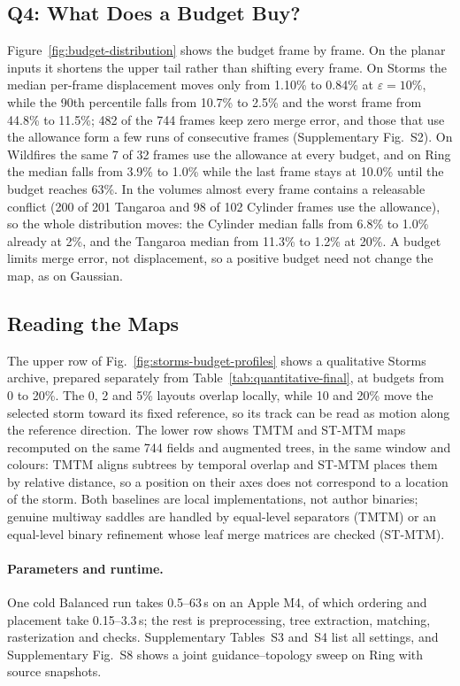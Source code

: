 \subsection{Q4: What Does a Budget Buy?}
Figure~\ref{fig:budget-distribution} shows the budget frame by frame. On the planar inputs it shortens the upper tail rather than shifting every frame. On Storms the median per-frame displacement moves only from 1.10\% to 0.84\% at $\varepsilon=10\%$, while the 90th percentile falls from 10.7\% to 2.5\% and the worst frame from 44.8\% to 11.5\%; 482 of the 744 frames keep zero merge error, and those that use the allowance form a few runs of consecutive frames (Supplementary Fig.~S2). On Wildfires the same 7 of 32 frames use the allowance at every budget, and on Ring the median falls from 3.9\% to 1.0\% while the last frame stays at 10.0\% until the budget reaches 63\%. In the volumes almost every frame contains a releasable conflict (200 of 201 Tangaroa and 98 of 102 Cylinder frames use the allowance), so the whole distribution moves: the Cylinder median falls from 6.8\% to 1.0\% already at 2\%, and the Tangaroa median from 11.3\% to 1.2\% at 20\%. A budget limits merge error, not displacement, so a positive budget need not change the map, as on Gaussian.

\subsection{Reading the Maps}\label{sec:reading}
The upper row of Fig.~\ref{fig:storms-budget-profiles} shows a qualitative Storms archive, prepared separately from Table~\ref{tab:quantitative-final}, at budgets from 0 to 20\%. The 0, 2 and 5\% layouts overlap locally, while 10 and 20\% move the selected storm toward its fixed reference, so its track can be read as motion along the reference direction. The lower row shows TMTM and ST-MTM maps recomputed on the same 744 fields and augmented trees, in the same window and colours: TMTM aligns subtrees by temporal overlap and ST-MTM places them by relative distance, so a position on their axes does not correspond to a location of the storm. Both baselines are local implementations, not author binaries; genuine multiway saddles are handled by equal-level separators (TMTM) or an equal-level binary refinement whose leaf merge matrices are checked (ST-MTM).

\paragraph{Parameters and runtime.}
One cold Balanced run takes 0.5--63\,s on an Apple M4, of which ordering and placement take 0.15--3.3\,s; the rest is preprocessing, tree extraction, matching, rasterization and checks. Supplementary Tables~S3 and~S4 list all settings, and Supplementary Fig.~S8 shows a joint guidance--topology sweep on Ring with source snapshots.

